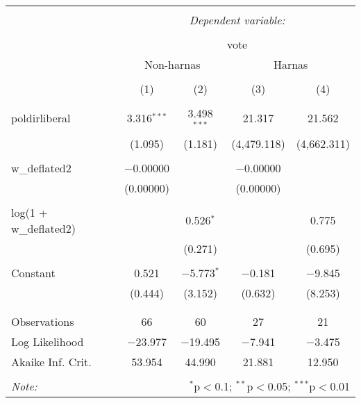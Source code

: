 
\begin{table}[!htbp] \centering 
  \caption{} 
  \label{} 
\begin{tabular}{@{\extracolsep{5pt}}lcccc} 
\\[-1.8ex]\hline 
\hline \\[-1.8ex] 
 & \multicolumn{4}{c}{\textit{Dependent variable:}} \\ 
\cline{2-5} 
\\[-1.8ex] & \multicolumn{4}{c}{vote} \\ 
 & \multicolumn{2}{c}{Non-harnas} & \multicolumn{2}{c}{Harnas} \\ 
\\[-1.8ex] & (1) & (2) & (3) & (4)\\ 
\hline \\[-1.8ex] 
 poldirliberal & 3.316$^{***}$ & 3.498$^{***}$ & 21.317 & 21.562 \\ 
  & (1.095) & (1.181) & (4,479.118) & (4,662.311) \\ 
  & & & & \\ 
 w\_deflated2 & $-$0.00000 &  & $-$0.00000 &  \\ 
  & (0.00000) &  & (0.00000) &  \\ 
  & & & & \\ 
 log(1 + w\_deflated2) &  & 0.526$^{*}$ &  & 0.775 \\ 
  &  & (0.271) &  & (0.695) \\ 
  & & & & \\ 
 Constant & 0.521 & $-$5.773$^{*}$ & $-$0.181 & $-$9.845 \\ 
  & (0.444) & (3.152) & (0.632) & (8.253) \\ 
  & & & & \\ 
\hline \\[-1.8ex] 
Observations & 66 & 60 & 27 & 21 \\ 
Log Likelihood & $-$23.977 & $-$19.495 & $-$7.941 & $-$3.475 \\ 
Akaike Inf. Crit. & 53.954 & 44.990 & 21.881 & 12.950 \\ 
\hline 
\hline \\[-1.8ex] 
\textit{Note:}  & \multicolumn{4}{r}{$^{*}$p$<$0.1; $^{**}$p$<$0.05; $^{***}$p$<$0.01} \\ 
\end{tabular} 
\end{table} 

